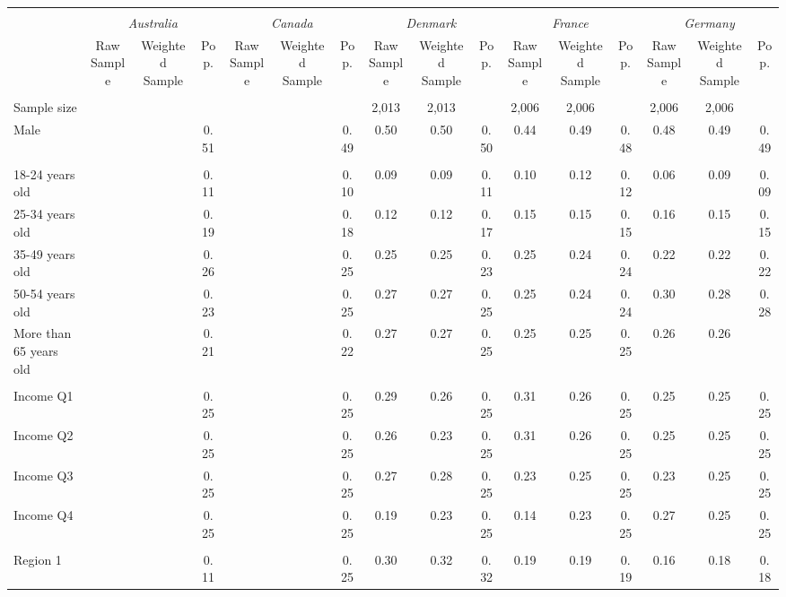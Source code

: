 \begin{tabular}{l*{15}{c}}
\toprule
\hline \\[-1.8ex]
\multicolumn{1}{c}{\em{ }} & \multicolumn{3}{c}{\em{Australia}} & \multicolumn{3}{c}{\em{Canada}} & \multicolumn{3}{c}{\em{Denmark}} & \multicolumn{3}{c}{\em{France}} & \multicolumn{3}{c}{\em{Germany}} \\
\cmidrule(l{3pt}r{3pt}){2-4} \cmidrule(l{3pt}r{3pt}){5-7} \cmidrule(l{3pt}r{3pt}){8-10} \cmidrule(l{3pt}r{3pt}){11-13} \cmidrule(l{3pt}r{3pt}){14-16}
\noalign{\smallskip}  & Raw Sample & Weighted Sample & Pop. & Raw Sample & Weighted Sample & Pop. & Raw Sample & Weighted Sample & Pop. & Raw Sample & Weighted Sample & Pop. & Raw Sample & Weighted Sample & Pop. \\
\hline \\[-1.8ex] 
Sample size & & & & & & & 2,013 & 2,013 & & 2,006 & 2,006 & & 2,006 & 2,006 & \\
\noalign{\smallskip}\hline \noalign{\smallskip}Male & & & 0.51 & & & 0.49 & 0.50 & 0.50 & 0.50 & 0.44 & 0.49 & 0.48 & 0.48 & 0.49 & 0.49 \\ 
\\
18-24 years old & & & 0.11 & & & 0.10 & 0.09 & 0.09 & 0.11 & 0.10 & 0.12 & 0.12 & 0.06 & 0.09 & 0.09 \\
25-34 years old & & & 0.19 & & & 0.18 & 0.12 & 0.12 & 0.17 & 0.15 & 0.15 & 0.15 & 0.16 & 0.15 & 0.15 \\
35-49 years old & & & 0.26 & & & 0.25 & 0.25 & 0.25 & 0.23 & 0.25 & 0.24 & 0.24 & 0.22 & 0.22 & 0.22 \\
50-54 years old & & & 0.23 & & & 0.25 & 0.27 & 0.27 & 0.25 & 0.25 & 0.24 & 0.24 & 0.30 & 0.28 & 0.28 \\
More than 65 years old & & & 0.21 & & & 0.22 & 0.27 & 0.27 & 0.25 & 0.25 & 0.25 & 0.25 & 0.26 & 0.26 \\ 
\\
Income Q1 & & & 0.25 & & & 0.25 & 0.29 & 0.26 & 0.25 & 0.31 & 0.26 & 0.25 & 0.25 & 0.25 & 0.25 \\
Income Q2 & & & 0.25 & & & 0.25 & 0.26 & 0.23 & 0.25 & 0.31 & 0.26 & 0.25 & 0.25 & 0.25 & 0.25 \\
Income Q3 & & & 0.25 & & & 0.25 & 0.27 & 0.28 & 0.25 & 0.23 & 0.25 & 0.25 & 0.23 & 0.25 & 0.25 \\
Income Q4 & & & 0.25 & & & 0.25 & 0.19 & 0.23 & 0.25 & 0.14 & 0.23 & 0.25 & 0.27 & 0.25 & 0.25 \\
\\
Region 1 & & & 0.11 & & & 0.25 & 0.30 & 0.32 & 0.32 & 0.19 & 0.19 & 0.19 & 0.16 & 0.18 & 0.18 \\

\end{tabular}
